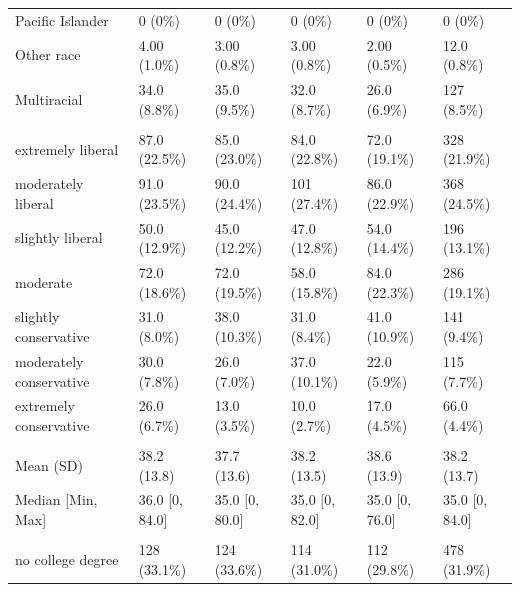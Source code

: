 \documentclass[
]{book}
\begin{document}
\begin{table}
\begin{tabular}[t]{llllll}
\hspace{1em}Pacific Islander & 0 (0\%) & 0 (0\%) & 0 (0\%) & 0 (0\%) & 0 (0\%)\\
\hspace{1em}Other race & 4.00 (1.0\%) & 3.00 (0.8\%) & 3.00 (0.8\%) & 2.00 (0.5\%) & 12.0 (0.8\%)\\
\hspace{1em}Multiracial & 34.0 (8.8\%) & 35.0 (9.5\%) & 32.0 (8.7\%) & 26.0 (6.9\%) & 127 (8.5\%)\\
\addlinespace[0.3em]
\multicolumn{6}{l}{\textbf{Political orientation}}\\
\hspace{1em}extremely liberal & 87.0 (22.5\%) & 85.0 (23.0\%) & 84.0 (22.8\%) & 72.0 (19.1\%) & 328 (21.9\%)\\
\hspace{1em}moderately liberal & 91.0 (23.5\%) & 90.0 (24.4\%) & 101 (27.4\%) & 86.0 (22.9\%) & 368 (24.5\%)\\
\hspace{1em}slightly liberal & 50.0 (12.9\%) & 45.0 (12.2\%) & 47.0 (12.8\%) & 54.0 (14.4\%) & 196 (13.1\%)\\
\hspace{1em}moderate & 72.0 (18.6\%) & 72.0 (19.5\%) & 58.0 (15.8\%) & 84.0 (22.3\%) & 286 (19.1\%)\\
\hspace{1em}slightly conservative & 31.0 (8.0\%) & 38.0 (10.3\%) & 31.0 (8.4\%) & 41.0 (10.9\%) & 141 (9.4\%)\\
\hspace{1em}moderately conservative & 30.0 (7.8\%) & 26.0 (7.0\%) & 37.0 (10.1\%) & 22.0 (5.9\%) & 115 (7.7\%)\\
\hspace{1em}extremely conservative & 26.0 (6.7\%) & 13.0 (3.5\%) & 10.0 (2.7\%) & 17.0 (4.5\%) & 66.0 (4.4\%)\\
\addlinespace[0.3em]
\multicolumn{6}{l}{\textbf{Age}}\\
\hspace{1em}Mean (SD) & 38.2 (13.8) & 37.7 (13.6) & 38.2 (13.5) & 38.6 (13.9) & 38.2 (13.7)\\
\hspace{1em}Median [Min, Max] & 36.0 [0, 84.0] & 35.0 [0, 80.0] & 35.0 [0, 82.0] & 35.0 [0, 76.0] & 35.0 [0, 84.0]\\
\addlinespace[0.3em]
\multicolumn{6}{l}{\textbf{Education}}\\
\hspace{1em}no college degree & 128 (33.1\%) & 124 (33.6\%) & 114 (31.0\%) & 112 (29.8\%) & 478 (31.9\%)\\

\end{tabular}
\end{table}
\end{document}
